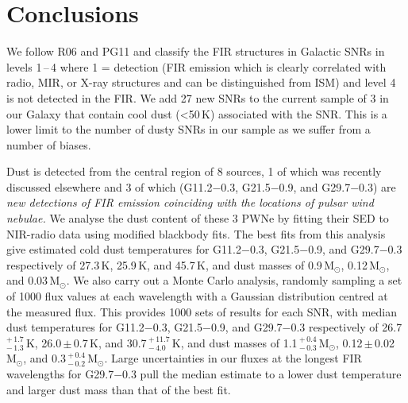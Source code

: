 \documentclass[fleqn,usenatbib]{mnras}
\newcommand\ColdMassa{1.1}		%
\newcommand\ColdMassaP{0.4}
\newcommand\ColdMassaN{0.3}
\newcommand\ColdMassaBest{0.9}
\newcommand\ColdMassb{0.12}		%
\newcommand\ColdMassbP{0.02}
\newcommand\ColdMassbBest{0.12}
\newcommand\ColdMassc{0.3}		%
\newcommand\ColdMasscP{0.4}
\newcommand\ColdMasscN{0.2}
\newcommand\ColdMasscBest{0.03}
\newcommand\ColdTempa{26.7}		%
\newcommand\ColdTempaP{1.7}
\newcommand\ColdTempaN{1.3}
\newcommand\ColdTempaBest{27.3}
\newcommand\ColdTempb{26.0}		%
\newcommand\ColdTempbP{0.7}
\newcommand\ColdTempbBest{25.9}
\newcommand\ColdTempc{30.7}		%
\newcommand\ColdTempcP{11.7}
\newcommand\ColdTempcN{4.0}
\newcommand\ColdTempcBest{45.7}
\newcommand\numNewDetections{27 }	%
\newcommand\numCentral{8 }		%
\begin{document}
{{\section{Conclusions} \label{conclusions}
We follow R06 and PG11 and classify the FIR structures in Galactic SNRs in levels 1\,--\,4 where 1 = detection (FIR emission which is clearly correlated with radio, MIR, or X-ray structures and can be distinguished from ISM) and level 4 is not detected in the FIR. We add \numNewDetections new SNRs to the current sample of 3 in our Galaxy that contain cool dust (<50\,K) associated with the SNR. This is a lower limit to the number of dusty SNRs in our sample as we suffer from a number of biases.

Dust is detected from the central region of \numCentral sources, 1 of which was recently discussed elsewhere \citealp{Temim2017, Rho2018} and 3 of which (G11.2$-$0.3, G21.5$-$0.9, and G29.7$-$0.3) are \emph{new detections of FIR emission coinciding with the locations of pulsar wind nebulae.} We analyse the dust content of these 3 PWNe by fitting their SED to NIR-radio data using modified blackbody fits. The best fits from this analysis give estimated cold dust temperatures for G11.2$-$0.3, G21.5$-$0.9, and G29.7$-$0.3 respectively of \ColdTempaBest\,K, \ColdTempbBest\,K, and \ColdTempcBest\,K, and dust masses of \ColdMassaBest\,M$_\odot$, \ColdMassbBest\,M$_\odot$, and \ColdMasscBest\,M$_\odot$. We also carry out a Monte Carlo analysis, randomly sampling a set of 1000 flux values at each wavelength with a Gaussian distribution centred at the measured flux. This provides 1000 sets of results for each SNR, with median dust temperatures for G11.2$-$0.3, G21.5$-$0.9, and G29.7$-$0.3 respectively of \ColdTempa\,$^{+\,\ColdTempaP} _{-\,\ColdTempaN}$\,K, \ColdTempb\,$\pm$\,\ColdTempbP\,K, and \ColdTempc\,$^{+\,\ColdTempcP} _{-\,\ColdTempcN}$\,K, and dust masses of \ColdMassa\,$^{+\,\ColdMassaP} _{-\,\ColdMassaN}$\,M$_\odot$, \ColdMassb\,$\pm$\,\ColdMassbP\,M$_\odot$, and \ColdMassc\,$^{+\,\ColdMasscP} _{-\,\ColdMasscN}$\,M$_\odot$. Large uncertainties in our fluxes at the longest FIR wavelengths for G29.7$-$0.3 pull the median estimate to a lower dust temperature and larger dust mass than that of the best fit.

}}
\end{document}

